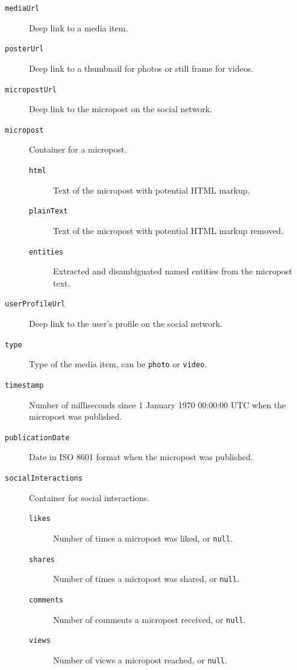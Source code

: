 \begin{description}
  \item[\texttt{mediaUrl}] Deep link to a media item.
  \item[\texttt{posterUrl}] Deep link to a thumbnail for photos
    or still frame for videos.
  \item[\texttt{micropostUrl}] Deep link to the micropost on
    the social network.
  \item[\texttt{micropost}] Container for a micropost.
  \begin{description}
    \item[\texttt{html}] Text of the micropost with potential HTML
      markup.
    \item[\texttt{plainText}] Text of the micropost with
      potential HTML markup removed.
    \item[\texttt{entities}] Extracted and disambiguated
      named entities from the micropost text.
  \end{description}      
  \item[\texttt{userProfileUrl}] Deep link to the user's
    profile on the social network.
  \item[\texttt{type}] Type of the media item,
    can be \texttt{photo} or \texttt{video}.
  \item[\texttt{timestamp}] Number of milliseconds since
    1 January 1970 00:00:00 UTC when the micropost was
    published.
  \item[\texttt{publicationDate}] Date in ISO 8601
    format when the micropost was published. 
  \item[\texttt{socialInteractions}] Container for social
    interactions.
  \begin{description}  
  \item[\texttt{likes}] Number of times a micropost was liked, or
    \texttt{null}.
  \item[\texttt{shares}] Number of times a micropost was shared, or
    \texttt{null}.
  \item[\texttt{comments}] Number of comments a micropost
    received, or \texttt{null}.
  \item[\texttt{views}] Number of views a micropost reached, or
    \texttt{null}.
  \end{description}    
\end{description}


